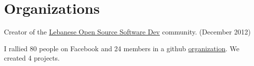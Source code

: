 \section{Organizations} %
Creator of the \href{https://www.facebook.com/groups/390113624411131/}{Lebanese Open Source Software Dev} community. (December 2012)
\vspace{-0.1cm}
\begin{outerlist}
\item[] I rallied 80 people on Facebook and 24 members in a github \href{https://github.com/Lebanese-OSS}{organization}. We created 4 projects.
\end{outerlist}
\label{sec:section}


